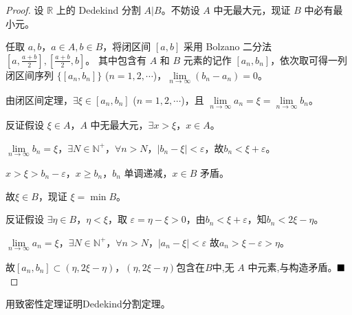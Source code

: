     \begin{proof}
        设 $\mathbb{R}$ 上的 Dedekind 分割 $A|B$。不妨设 $A$ 中无最大元，现证 $B$ 中必有最小元。
    
        任取 $a, b$，$a \in A, b \in B$，将闭区间 $[a, b]$ 采用 Bolzano 二分法 $\left[a, \frac{a+b}{2}\right], \left[\frac{a+b}{2}, b\right]$。
        其中包含有 $A$ 和 $B$ 元素的记作 $[a_n, b_n]$，依次取可得一列闭区间序列 $\{[a_n, b_n]\}$ ($n=1,2,\cdots$)，$\lim\limits_{n \to \infty} (b_n - a_n) = 0$。
    
        由闭区间定理，$\exists \xi \in [a_n, b_n]$ ($n=1,2,\cdots$)，且 $\lim\limits_{n \to \infty} a_n = \xi = \lim\limits_{n \to \infty} b_n$。
    
        反证假设 $\xi \in A$，$A$ 中无最大元，$\exists x > \xi$，$x \in A$。
    
        $\lim\limits_{n \to \infty} b_n = \xi$，$\exists N \in \mathbb{N}^+$，$\forall n > N$，$|b_n - \xi| < \varepsilon$，故$b_n < \xi + \varepsilon$。
    
        $x > \xi > b_n - \varepsilon$，$x \geq b_n$，$b_n$ 单调递减，$x \in B$ 矛盾。
    
        故$\xi \in B$，现证 $\xi = \min B$。
    
        反证假设 $\exists \eta \in B$，$\eta < \xi$，取 $\varepsilon = \eta - \xi > 0$，由$b_n < \xi + \varepsilon$，知$b_n < 2\xi - \eta$。
    
        $\lim\limits_{n \to \infty} a_n = \xi$，$\exists N \in \mathbb{N}^+$，$\forall n > N$，$|a_n - \xi| < \varepsilon $ 故$a_n > \xi - \varepsilon > \eta$。
    
        故$[a_n, b_n] \subset (\eta, 2\xi - \eta)$，$(\eta, 2\xi - \eta)$包含在$B$中,无 $A$ 中元素,与构造矛盾。$\hfill \blacksquare$
     \end{proof}

    \begin{problem}
        用致密性定理证明Dedekind分割定理。
    \end{problem}
    

